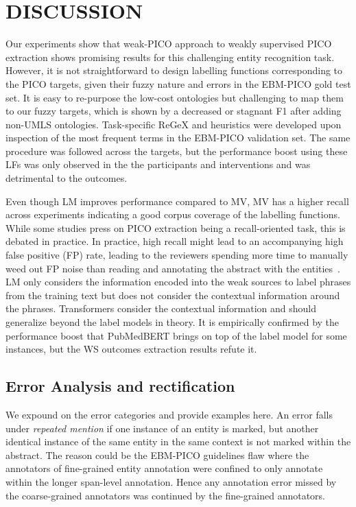 \documentclass[10.7pt,]{article}
\begin{document}
\section{DISCUSSION}\label{discussion}
%
Our experiments show that weak-PICO approach to weakly supervised PICO extraction shows promising results for this challenging entity recognition task.
However, it is not straightforward to design labelling functions corresponding to the PICO targets, given their fuzzy nature and errors in the EBM-PICO gold test set.
It is easy to re-purpose the low-cost ontologies but challenging to map them to our fuzzy targets, which is shown by a decreased or stagnant F1 after adding non-UMLS ontologies.
Task-specific ReGeX and heuristics were developed upon inspection of the most frequent terms in the EBM-PICO validation set.
The same procedure was followed across the targets, but the performance boost using these LFs was only observed in the the participants and interventions and was detrimental to the outcomes.


Even though LM improves performance compared to MV, MV has a higher recall across experiments indicating a good corpus coverage of the labelling functions.
While some studies press on PICO extraction being a recall-oriented task, this is debated in practice.
In practice, high recall might lead to an accompanying high false positive (FP) rate, leading to the reviewers spending more time to manually weed out FP noise than reading and annotating the abstract with the entities~\cite{liu2021sent2span}. 
LM only considers the information encoded into the weak sources to label phrases from the training text but does not consider the contextual information around the phrases.
Transformers consider the contextual information and should generalize beyond the label models in theory.
It is empirically confirmed by the performance boost that PubMedBERT brings on top of the label model for some instances, but the WS outcomes extraction results refute it.
%
%
%
\subsection{Error Analysis and rectification}\label{err_ana}
%
We expound on the error categories and provide examples here.
An error falls under \textit{repeated mention} if one instance of an entity is marked, but another identical instance of the same entity in the same context is not marked within the abstract. 
The reason could be the EBM-PICO guidelines flaw where the annotators of fine-grained entity annotation were confined to only annotate within the longer span-level annotation.
Hence any annotation error missed by the coarse-grained annotators was continued by the fine-grained annotators.
\end{document}
